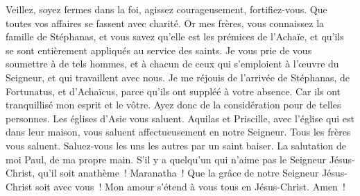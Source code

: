 \begin{multicols}{2}
Veillez, soyez fermes dans la foi, agissez courageusement, fortifiez-vous.
Que toutes vos affaires se fassent avec charité.
Or mes frères, vous connaissez la famille de Stéphanas, et vous savez qu'elle est les prémices de l'Achaïe, et qu'ils se sont entièrement appliqués au service des saints.
Je vous prie de vous soumettre à de tels hommes, et à chacun de ceux qui s'emploient à l'œuvre du Seigneur, et qui travaillent avec nous.
Je me réjouis de l'arrivée de Stéphanas, de Fortunatus, et d'Achaïcus, parce qu'ils ont suppléé à votre absence.
Car ils ont tranquillisé mon esprit et le vôtre. Ayez donc de la considération pour de telles personnes.
Les églises d'Asie vous saluent. Aquilas et Priscille, avec l'église qui est dans leur maison, vous saluent affectueusement en notre Seigneur.
Tous les frères vous saluent. Saluez-vous les uns les autres par un saint baiser.
La salutation de moi Paul, de ma propre main.
S'il y a quelqu'un qui n'aime pas le Seigneur Jésus-Christ, qu'il soit anathème~! Maranatha~!
Que la grâce de notre Seigneur Jésus-Christ soit avec vous~!
Mon amour s'étend à vous tous en Jésus-Christ. Amen~!
\PPE{}
\end{multicols}
